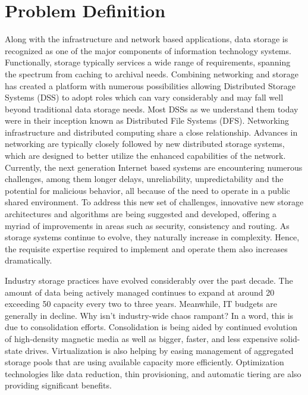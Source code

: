 \documentclass[11pt]{article}
\begin{document}
\newpage

\section{Problem Definition}
Along with the infrastructure and network based applications, data 
storage is recognized as one of the major components of information 
technology systems.  Functionally, storage typically services a wide 
range of requirements, spanning the spectrum from caching to archival 
needs. Combining networking and storage has created a platform with 
numerous possibilities allowing Distributed Storage Systems (DSS) to 
adopt roles which can vary considerably and may fall well beyond 
traditional data storage needs. Most DSSs as we understand them today 
were in their inception known as Distributed File Systems (DFS). 
Networking infrastructure and distributed computing share a close 
relationship. Advances in networking are typically closely followed 
by new distributed storage systems, which are designed to better 
utilize the enhanced capabilities of the network. Currently, the next 
generation Internet based systems are encountering numerous challenges, 
among them longer delays, unreliability, unpredictability and the 
potential for malicious behavior, all because of the need to operate 
in a public shared environment. To address this new set of challenges, 
innovative new storage architectures and algorithms are being 
suggested and developed, offering a myriad of improvements in areas 
such as security, consistency and routing. As storage systems continue 
to evolve, they naturally increase in complexity. Hence, the requisite 
expertise required to implement and operate them also increases 
dramatically. 

Industry storage practices have evolved considerably over the past 
decade. The amount of data being actively managed continues to expand 
at around 20%
exceeding 50%
capacity every two to three years. Meanwhile, IT budgets are generally 
in decline. Why isn’t industry-wide chaos rampant? In a word, this is 
due to consolidation efforts. Consolidation is being aided by 
continued evolution of high-density magnetic media as well as bigger, 
faster, and less expensive solid-state drives. Virtualization is also 
helping by easing management of aggregated storage pools that are using 
available capacity more efficiently. Optimization technologies like data 
reduction, thin provisioning, and automatic tiering are also providing 
significant benefits.
\end{document}
